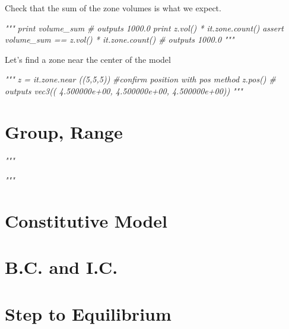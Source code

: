 \documentclass[a4paper, nobind]{templates/ociamthesis}
\newenvironment{Shaded}{\begin{snugshade}}{\end{snugshade}}
\newcommand{\CommentTok}[1]{\textcolor[rgb]{0.56,0.35,0.01}{\textit{#1}}}
\renewenvironment{Shaded}
{
  \vspace{10pt}%
  \begin{snugshade}%
}{%
  \end{snugshade}%
  \vspace{8pt}%
}
\begin{document}
Check that the sum of the zone volumes is what we expect.

\begin{Shaded}
\begin{Highlighting}[]
\CommentTok{"""}
\CommentTok{print volume\_sum \# outputs 1000.0}
\CommentTok{print z.vol() * it.zone.count()}
\CommentTok{assert volume\_sum == z.vol() * it.zone.count() \# outputs 1000.0}
\CommentTok{"""}
\end{Highlighting}
\end{Shaded}

Let's find a zone near the center of the model

\begin{Shaded}
\begin{Highlighting}[]
\CommentTok{"""}
\CommentTok{z = it.zone.near ((5,5,5))}
\CommentTok{\#confirm position with pos method}
\CommentTok{z.pos() \# outputs vec3(( 4.500000e+00, 4.500000e+00, 4.500000e+00))}
\CommentTok{"""}
\end{Highlighting}
\end{Shaded}

\hypertarget{group-range}{%
\section{Group, Range}\label{group-range}}

\begin{Shaded}
\begin{Highlighting}[]
\CommentTok{"""}

\CommentTok{"""}
\end{Highlighting}
\end{Shaded}

\hypertarget{constitutive-model}{%
\section{Constitutive Model}\label{constitutive-model}}

\hypertarget{b.c.-and-i.c.}{%
\section{B.C. and I.C.}\label{b.c.-and-i.c.}}

\hypertarget{step-to-equilibrium}{%
\section{Step to Equilibrium}\label{step-to-equilibrium}}
\end{document}
